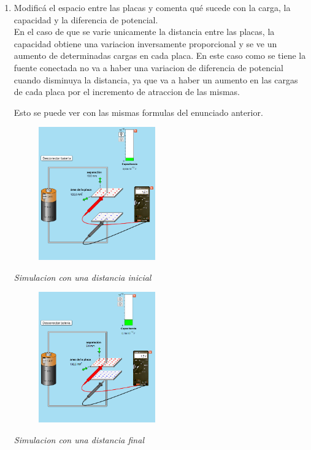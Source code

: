 \documentclass[12pt]{report}
\begin{document}
\begin{enumerate}
    \item Modificá el espacio entre las placas y comenta qué sucede con la carga, la capacidad y la diferencia de potencial.\\

    En el caso de que se varie unicamente la distancia entre las placas, la capacidad obtiene una variacion inversamente proporcional y se ve un aumento de determinadas cargas en cada placa. En este caso como se tiene la fuente conectada no va a haber una variacion de diferencia de potencial cuando disminuya la distancia, ya que va a haber un aumento en las cargas de cada placa por el incremento de atraccion de las mismas.

Esto se puede ver con las mismas formulas del enunciado anterior.\\

\newpage

\begin{figure}[h]
    \centering
    \includegraphics[width=0.475\textwidth]{./images/1FOTO5.png}
\end{figure}
    \textit{Simulacion con una distancia inicial}


\begin{figure}[h]
    \centering
    \includegraphics[width=0.475\textwidth]{./images/1FOTO6.png}
\end{figure}
    \textit{Simulacion con una distancia final}

    \vspace{13cm}
\end{enumerate}
\end{document}
